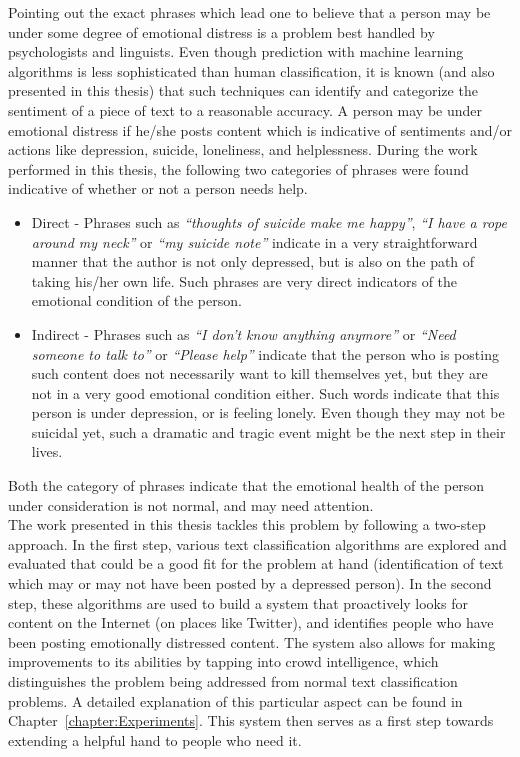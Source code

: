 Pointing out the exact phrases which lead one to believe that a person may be under some degree of emotional distress is a problem best handled by psychologists and linguists. Even though prediction with machine learning algorithms is less sophisticated than human classification, it is known (and also presented in this thesis) that such techniques can identify and categorize the sentiment of a piece of text to a reasonable accuracy. A person may be under emotional distress if he/she posts content which is indicative of sentiments and/or actions like depression, suicide, loneliness, and helplessness. During the work performed in this thesis, the following two categories of phrases were found indicative of whether or not a person needs help.

\begin{itemize}
    \item{
    Direct - Phrases such as \emph{``thoughts of suicide make me happy''}, \emph{``I have a rope around my neck''} or \emph{``my suicide note''} indicate in a very straightforward manner that the author is not only depressed, but is also on the path of taking his/her own life. Such phrases are very direct indicators of the emotional condition of the person.
    }
    \item{
    Indirect - Phrases such as \emph{``I don't know anything anymore''} or \emph{``Need someone to talk to''} or \emph{``Please help''} indicate that the person who is posting such content does not necessarily want to kill themselves yet, but they are not in a very good emotional condition either. Such words indicate that this person is under depression, or is feeling lonely. Even though they may not be suicidal yet, such a dramatic and tragic event might be the next step in their lives.
    }
\end{itemize}

Both the category of phrases indicate that the emotional health of the person under consideration is not normal, and may need attention.\\

The work presented in this thesis tackles this problem by following a two-step approach. In the first step, various text classification algorithms are explored and evaluated that could be a good fit for the problem at hand (identification of text which may or may not have been posted by a depressed person). In the second step, these algorithms are used to build a system that proactively looks for content on the Internet (on places like Twitter), and identifies people who have been posting emotionally distressed content. The system also allows for making improvements to its abilities by tapping into crowd intelligence, which distinguishes the problem being addressed from normal text classification problems. A detailed explanation of this particular aspect can be found in Chapter~\ref{chapter:Experiments}. This system then serves as a first step towards extending a helpful hand to people who need it.
